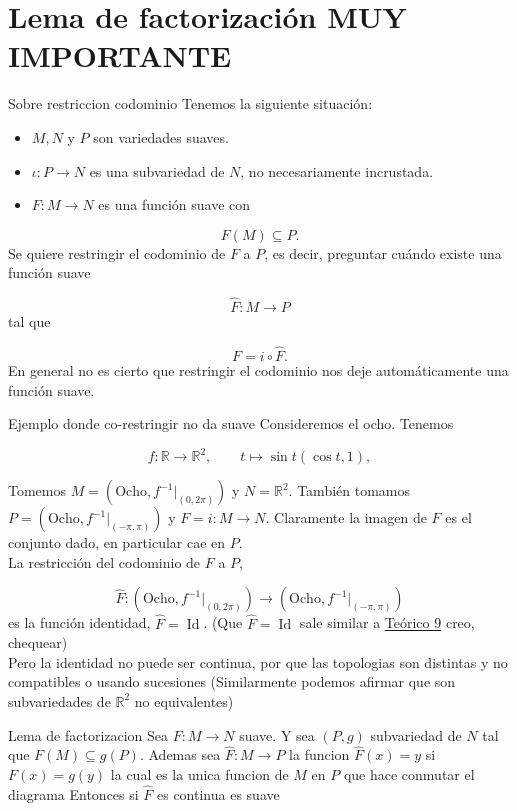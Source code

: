 \section{Lema de factorización MUY IMPORTANTE}
\begin{bookremark}{Sobre restriccion codominio}
Tenemos la siguiente situación:

\begin{itemize}
\item $M,N$ y $P$ son variedades suaves.
\item $\iota:P\to N$ es una subvariedad de $N$, no necesariamente incrustada.
\item $F:M\to N$ es una función suave con
\end{itemize}
\[
F(M)\subseteq P.
\]
Se quiere restringir el codominio de $F$ a $P$, es decir, preguntar cuándo existe una función suave

\[
\widehat F:M\to P
\]
tal que

\[
F=i\circ\widehat F.
\]
En general no es cierto que restringir el codominio nos deje automáticamente una función suave.

\end{bookremark}
\begin{bookexample}{Ejemplo donde co-restringir no da suave}
Consideremos el ocho. Tenemos

\[
f:\mathbb R\to\mathbb R^2,\qquad t\mapsto \sin t(\cos t,1),
\]

 Tomemos $M=(\text{Ocho},f^{-1}|_{(0,2\pi)})$ y $N=\mathbb{R}^2.$ También tomamos $P=(\text{Ocho},f^{-1}|_{(-\pi,\pi)})$ y $F=i:M\to N.$ Claramente la imagen de $F$ es el conjunto dado, en particular cae en $P$.\\
La restricción del codominio de $F$ a $P$,

\[
\widehat{F}:(\text{Ocho},f^{-1}|_{(0,2\pi)})\to (\text{Ocho},f^{-1}|_{(-\pi,\pi)})
\]
es la función identidad, $\widehat F=\operatorname{Id}$. (Que $\widehat{F}=\operatorname{Id}$ sale similar a \hyperref[blk:8ed2bd]{Teórico 9} creo, chequear)\\
Pero la identidad no puede ser continua, por que las topologias son distintas y no compatibles o usando sucesiones (Similarmente podemos afirmar que son subvariedades de $\mathbb{R}^{2}$ no equivalentes)

\end{bookexample}
\begin{bookproposition}{Lema de factorizacion}
Sea $F:M\rightarrow N$ suave. Y sea $(P,g)$ subvariedad de $N$ tal que $F(M)\subseteq g(P)$. Ademas sea $\widehat{F}:M\rightarrow P$ la funcion $\widehat{F}(x)=y$ si $F(x)=g(y)$ la cual es la unica funcion de $M$ en $P$ que hace conmutar el diagrama 
 Entonces si $\widehat{F}$ es continua es suave

\end{bookproposition}

